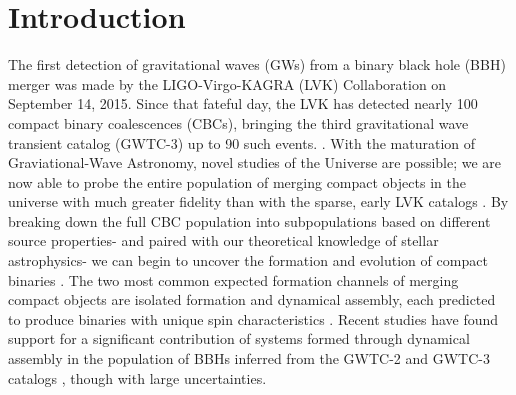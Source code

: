\section{Introduction} \label{sec:intro}

The first detection of gravitational waves (GWs) from a binary black hole (BBH) merger was made by the LIGO-Virgo-KAGRA (LVK) Collaboration on September 14, 2015. Since that fateful day, the LVK has detected nearly 100 compact binary coalescences (CBCs), bringing the third gravitational wave transient catalog (GWTC-3) up to 90 such events. \citep{2015CQGra..32g4001L,2015CQGra..32b4001A,2021PTEP.2021eA102A,2016PhRvL.116f1102A,2019PhRvX...9c1040A,2021PhRvX..11b1053A,2021arXiv211103606T}. With the maturation of Graviational-Wave Astronomy, novel studies of the Universe are possible; we are now able to probe the entire population of merging compact objects in the universe with much greater fidelity than with the sparse, early LVK catalogs \citep{2019ApJ...882L..24A,2021ApJ...913L...7A,2021arXiv211103634T}. By breaking down the full CBC population into subpopulations based on different source properties- and paired with our theoretical knowledge of stellar astrophysics- we can begin to uncover the formation and evolution of compact binaries \citep{2017ApJ...846...82Z}. The two most common expected formation channels of merging compact objects are isolated formation and dynamical assembly, each predicted to produce binaries with unique spin characteristics \citep{2017Natur.548..426F,2018ApJ...854L...9F}. Recent studies have found support for a significant contribution of systems formed through dynamical assembly in the population of BBHs inferred from the GWTC-2 and GWTC-3 catalogs \citep{2021ApJ...913L...7A,2021PhRvD.104h3010R,2021arXiv211103634T,2022ApJ...937L..13C,2021ApJ...921L..15G,2022arXiv220902206T,2022arXiv220906978V,2022arXiv221012834E}, though with large uncertainties. 


